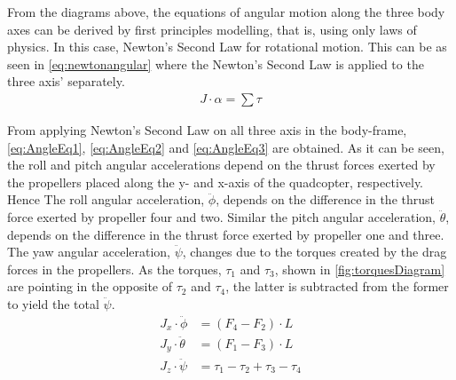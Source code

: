 From the diagrams above, the equations of angular motion along the three body axes can be derived by first principles modelling, that is, using only laws of physics. In this case, Newton's Second Law for rotational motion. This can be as seen in \autoref{eq:newtonangular} where the Newton's Second Law is applied to the three axis' separately.
%
\begin{align}
	J\cdot\alpha=\sum\tau
	\label{eq:newtonangular}
\end{align}
\begin{where}
\end{where}

%
From applying Newton's Second Law on all three axis in the body-frame, \autoref{eq:AngleEq1}, \ref{eq:AngleEq2} and \ref{eq:AngleEq3} are obtained. As it can be seen, the roll and pitch angular accelerations depend on the thrust forces exerted by the propellers placed along the y- and x-axis of the quadcopter, respectively. Hence The roll angular acceleration, $\ddot{\phi}$, depends on the difference in the thrust force exerted by propeller four and two. Similar the pitch angular acceleration, $\ddot{\theta}$, depends on the difference in the thrust force exerted by propeller one and three. The yaw angular acceleration, $\ddot{\psi}$, changes due to the torques created by the drag forces in the propellers. As the torques, $\tau_1$ and $\tau_3$, shown in \autoref{fig:torquesDiagram} are pointing in the opposite of $\tau_2$ and $\tau_4$, the latter is subtracted from the former to yield the total $\ddot{\psi}$.  
%
\begin{align}
	J_x\cdot\ddot{\phi}&=(F_4-F_2)\cdot L  \label{eq:AngleEq1} \\
	J_y\cdot\ddot{\theta}&=(F_1-F_3)\cdot L  \label{eq:AngleEq2}\\
	J_z\cdot\ddot{\psi}&=\tau_1-\tau_2+\tau_3-\tau_4
	\label{eq:AngleEq3}
\end{align}
\begin{where}
\end{where}

